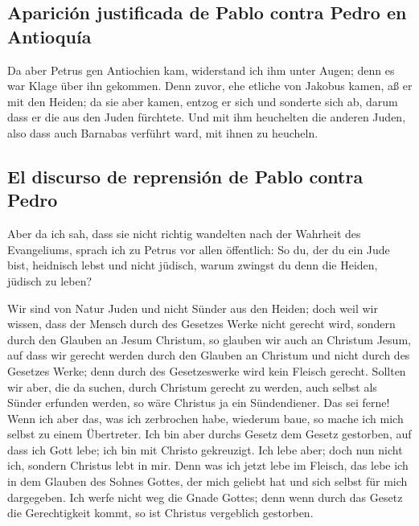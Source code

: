 \hypertarget{apariciuxf3n-justificada-de-pablo-contra-pedro-en-antioquuxeda}{%
\subsection{Aparición justificada de Pablo contra Pedro en
Antioquía}\label{apariciuxf3n-justificada-de-pablo-contra-pedro-en-antioquuxeda}}

 Da aber Petrus gen Antiochien kam, widerstand ich ihm
unter Augen; denn es war Klage über ihn gekommen.  Denn
zuvor, ehe etliche von Jakobus kamen, aß er mit den Heiden; da sie aber
kamen, entzog er sich und sonderte sich ab, darum dass er die aus den
Juden fürchtete.  Und mit ihm heuchelten die anderen
Juden, also dass auch Barnabas verführt ward, mit ihnen zu heucheln.

\hypertarget{el-discurso-de-reprensiuxf3n-de-pablo-contra-pedro}{%
\subsection{El discurso de reprensión de Pablo contra
Pedro}\label{el-discurso-de-reprensiuxf3n-de-pablo-contra-pedro}}

 Aber da ich sah, dass sie nicht richtig wandelten nach
der Wahrheit des Evangeliums, sprach ich zu Petrus vor allen öffentlich:
So du, der du ein Jude bist, heidnisch lebst und nicht jüdisch, warum
zwingst du denn die Heiden, jüdisch zu leben?

 Wir sind von Natur Juden und nicht Sünder aus den
Heiden;  doch weil wir wissen, dass der Mensch durch des
Gesetzes Werke nicht gerecht wird, sondern durch den Glauben an Jesum
Christum, so glauben wir auch an Christum Jesum, auf dass wir gerecht
werden durch den Glauben an Christum und nicht durch des Gesetzes Werke;
denn durch des Gesetzeswerke wird kein Fleisch gerecht. 
Sollten wir aber, die da suchen, durch Christum gerecht zu werden, auch
selbst als Sünder erfunden werden, so wäre Christus ja ein Sündendiener.
Das sei ferne!  Wenn ich aber das, was ich zerbrochen
habe, wiederum baue, so mache ich mich selbst zu einem Übertreter.
 Ich bin aber durchs Gesetz dem Gesetz gestorben, auf
dass ich Gott lebe; ich bin mit Christo gekreuzigt.  Ich
lebe aber; doch nun nicht ich, sondern Christus lebt in mir. Denn was
ich jetzt lebe im Fleisch, das lebe ich in dem Glauben des Sohnes
Gottes, der mich geliebt hat und sich selbst für mich dargegeben.
 Ich werfe nicht weg die Gnade Gottes; denn wenn durch
das Gesetz die Gerechtigkeit kommt, so ist Christus vergeblich
gestorben.

